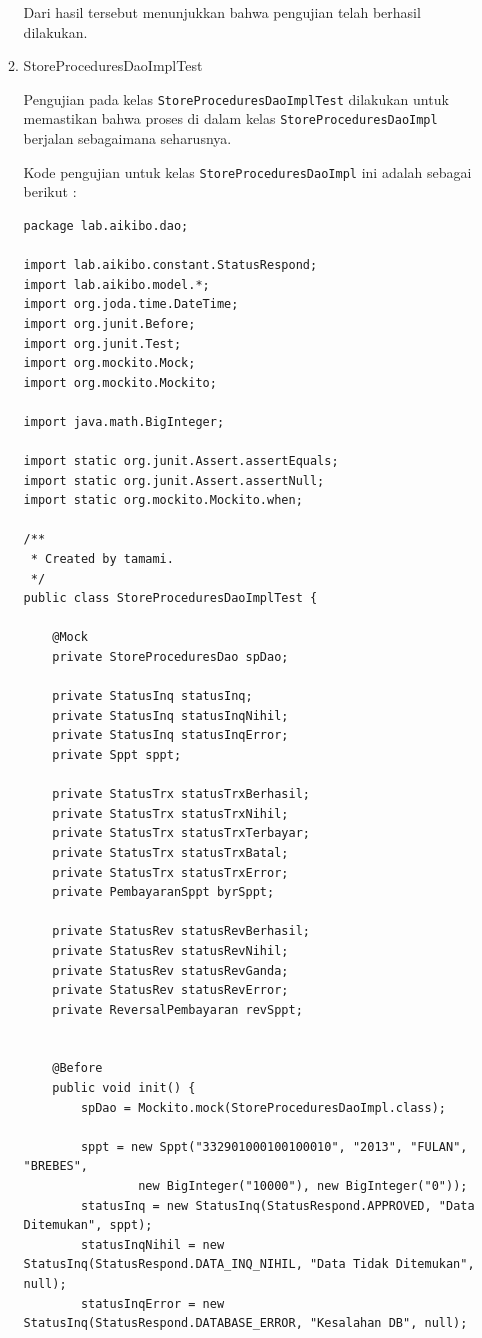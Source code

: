 \documentclass[pdftex,12pt, oneside]{article}
\begin{document}
\begin{enumerate}[A.]
\begin{enumerate}[1.]
    Dari hasil tersebut menunjukkan bahwa pengujian telah berhasil dilakukan.
    
    \item StoreProceduresDaoImplTest
    
    Pengujian pada kelas \texttt{StoreProceduresDaoImplTest} dilakukan untuk memastikan bahwa proses di dalam kelas \texttt{StoreProceduresDaoImpl} berjalan sebagaimana seharusnya.
    
    Kode pengujian untuk kelas \texttt{StoreProceduresDaoImpl} ini adalah sebagai berikut :
    
    \begin{lstlisting}
package lab.aikibo.dao;

import lab.aikibo.constant.StatusRespond;
import lab.aikibo.model.*;
import org.joda.time.DateTime;
import org.junit.Before;
import org.junit.Test;
import org.mockito.Mock;
import org.mockito.Mockito;

import java.math.BigInteger;

import static org.junit.Assert.assertEquals;
import static org.junit.Assert.assertNull;
import static org.mockito.Mockito.when;

/**
 * Created by tamami.
 */
public class StoreProceduresDaoImplTest {

    @Mock
    private StoreProceduresDao spDao;

    private StatusInq statusInq;
    private StatusInq statusInqNihil;
    private StatusInq statusInqError;
    private Sppt sppt;

    private StatusTrx statusTrxBerhasil;
    private StatusTrx statusTrxNihil;
    private StatusTrx statusTrxTerbayar;
    private StatusTrx statusTrxBatal;
    private StatusTrx statusTrxError;
    private PembayaranSppt byrSppt;

    private StatusRev statusRevBerhasil;
    private StatusRev statusRevNihil;
    private StatusRev statusRevGanda;
    private StatusRev statusRevError;
    private ReversalPembayaran revSppt;


    @Before
    public void init() {
        spDao = Mockito.mock(StoreProceduresDaoImpl.class);

        sppt = new Sppt("332901000100100010", "2013", "FULAN", "BREBES",
                new BigInteger("10000"), new BigInteger("0"));
        statusInq = new StatusInq(StatusRespond.APPROVED, "Data Ditemukan", sppt);
        statusInqNihil = new StatusInq(StatusRespond.DATA_INQ_NIHIL, "Data Tidak Ditemukan", null);
        statusInqError = new StatusInq(StatusRespond.DATABASE_ERROR, "Kesalahan DB", null);


\end{lstlisting}
\end{enumerate}
\end{enumerate}
\end{document}
